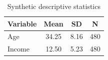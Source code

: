 \documentclass[11pt]{article}
\begin{document}
\begin{table}[htbp]\centering\caption{Synthetic descriptive statistics}
\begin{tabular}{lS[table-format=2.2]S[table-format=2.2]S[table-format=3.0]}\toprule
Variable & {Mean} & {SD} & {N}\\\midrule
Age & 34.25 & 8.16 & 480\\
Income & 12.50 & 5.23 & 480\\\bottomrule\end{tabular}\end{table}
\end{document}
